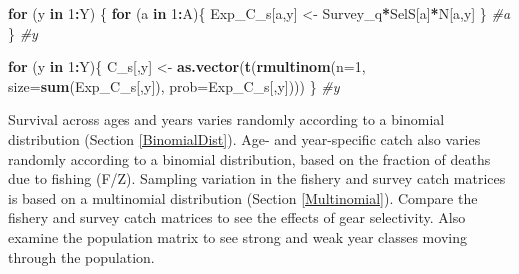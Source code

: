 \documentclass[
]{krantz}
\makeatletter
\newenvironment{Shaded}{\begin{snugshade}}{\end{snugshade}}
\newcommand{\AttributeTok}[1]{\textcolor[rgb]{0.27,0.27,0.27}{#1}}
\newcommand{\CommentTok}[1]{\textcolor[rgb]{0.37,0.37,0.37}{\textit{#1}}}
\newcommand{\ControlFlowTok}[1]{\textcolor[rgb]{0.27,0.27,0.27}{\textbf{#1}}}
\newcommand{\DecValTok}[1]{\textcolor[rgb]{0.06,0.06,0.06}{#1}}
\newcommand{\FunctionTok}[1]{\textcolor[rgb]{0.27,0.27,0.27}{\textbf{#1}}}
\newcommand{\NormalTok}[1]{#1}
\newcommand{\OtherTok}[1]{\textcolor[rgb]{0.37,0.37,0.37}{#1}}
\newcommand{\SpecialCharTok}[1]{\textcolor[rgb]{0.43,0.43,0.43}{\textbf{#1}}}
\newenvironment{kframe}{%
\medskip{}
\setlength{\fboxsep}{.8em}
 \def\at@end@of@kframe{}%
 \ifinner\ifhmode%
  \def\at@end@of@kframe{\end{minipage}}%
  \begin{minipage}{\columnwidth}%
 \fi\fi%
 \def\FrameCommand##1{\hskip\@totalleftmargin \hskip-\fboxsep
 \colorbox{shadecolor}{##1}\hskip-\fboxsep
     \hskip-\linewidth \hskip-\@totalleftmargin \hskip\columnwidth}%
 \MakeFramed {\advance\hsize-\width
   \@totalleftmargin\z@ \linewidth\hsize
   \@setminipage}}%
 {\par\unskip\endMakeFramed%
 \at@end@of@kframe}
\renewenvironment{Shaded}{\begin{kframe}}{\end{kframe}}
\makeatother
\begin{document}
\begin{Shaded}
\begin{Highlighting}[]
\ControlFlowTok{for}\NormalTok{ (y }\ControlFlowTok{in} \DecValTok{1}\SpecialCharTok{:}\NormalTok{Y) \{}
  \ControlFlowTok{for}\NormalTok{ (a }\ControlFlowTok{in} \DecValTok{1}\SpecialCharTok{:}\NormalTok{A)\{}
\NormalTok{    Exp\_C\_s[a,y] }\OtherTok{\textless{}{-}}\NormalTok{ Survey\_q}\SpecialCharTok{*}\NormalTok{SelS[a]}\SpecialCharTok{*}\NormalTok{N[a,y]}
\NormalTok{  \} }\CommentTok{\#a}
\NormalTok{\} }\CommentTok{\#y }

\ControlFlowTok{for}\NormalTok{ (y }\ControlFlowTok{in} \DecValTok{1}\SpecialCharTok{:}\NormalTok{Y)\{}
\NormalTok{  C\_s[,y] }\OtherTok{\textless{}{-}} \FunctionTok{as.vector}\NormalTok{(}\FunctionTok{t}\NormalTok{(}\FunctionTok{rmultinom}\NormalTok{(}\AttributeTok{n=}\DecValTok{1}\NormalTok{, }\AttributeTok{size=}\FunctionTok{sum}\NormalTok{(Exp\_C\_s[,y]), }
                                   \AttributeTok{prob=}\NormalTok{Exp\_C\_s[,y])))}
\NormalTok{  \} }\CommentTok{\#y}
\end{Highlighting}
\end{Shaded}

Survival across ages and years varies randomly according to a binomial distribution (Section \ref{BinomialDist}). Age- and year-specific catch also varies randomly according to a binomial distribution, based on the fraction of deaths due to fishing (F/Z). Sampling variation in the fishery and survey catch matrices is based on a multinomial distribution  (Section \ref{Multinomial}). Compare the fishery and survey catch matrices to see the effects of gear selectivity. Also examine the population matrix to see strong and weak year classes moving through the population.
\end{document}
